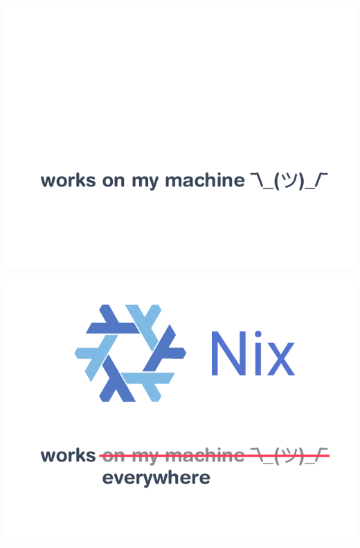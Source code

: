 \documentclass[aspectratio=169]{beamer}
\begin{document}
\begin{frame}
     {
        \begin{center}
            \includegraphics[height=0.98\textheight]{img/schema-nix-motto-pre.pdf}
        \end{center}
    }
     {
        \begin{center}
            \includegraphics[height=0.98\textheight]{img/schema-nix-motto.pdf}
        \end{center}
    }
\end{frame}
\end{document}
